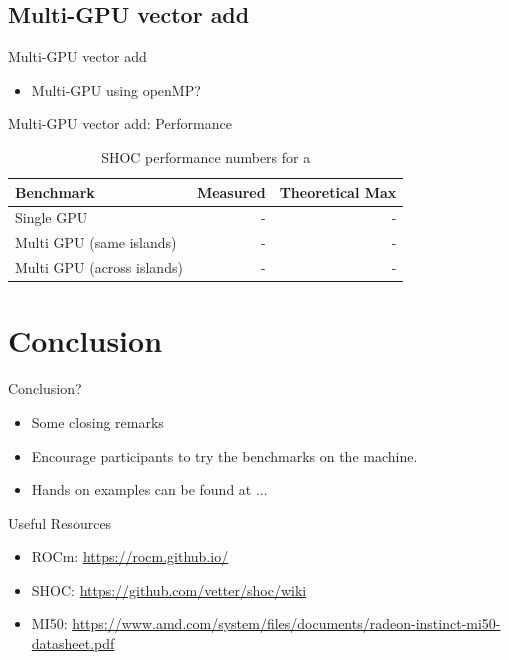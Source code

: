 \documentclass[aspectratio=169]{beamer}
\begin{document}
\subsection{Multi-GPU vector add}
\begin{frame}{Multi-GPU vector add}
    \begin{itemize}
        \item Multi-GPU using openMP?
    \end{itemize}
\end{frame}

\begin{frame}{Multi-GPU vector add: Performance}
\begin{table}[]
    \centering
    \begin{tabular}{l|r|r}
Benchmark & Measured & Theoretical Max \\
\hline
Single GPU      & - & - \\
Multi GPU (same islands) & - & - \\
Multi GPU (across islands) & - & - \\
\hline
\end{tabular}
    \caption{SHOC performance numbers for a }
    \label{tab:vec-add-numbers}
\end{table}
\end{frame}

\section{Conclusion}
\begin{frame}{Conclusion?}
    \begin{itemize}
        \item Some closing remarks
        \item Encourage participants to try the benchmarks on the machine.
        \item Hands on examples can be found at ...
    \end{itemize}
\end{frame}


\begin{frame}{Useful Resources}
    \begin{itemize}
        \item ROCm: \url{https://rocm.github.io/}
        \item SHOC: \url{https://github.com/vetter/shoc/wiki}
        \item MI50: \url{https://www.amd.com/system/files/documents/radeon-instinct-mi50-datasheet.pdf}
    \end{itemize}
\end{frame}
\end{document}
